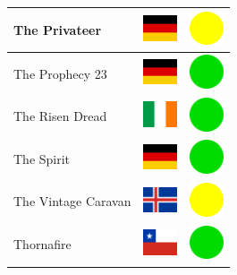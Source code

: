 \documentclass[12pt, a4paper, twoside]{report}
\begin{document}
\begin{center}
\begin{longtable}{|p{5cm}|p{2cm}|p{2cm}|}
The Privateer & \includegraphics[width=1cm]{4x3/de} & \includegraphics[width=1cm]{likes/m} \\ \hline
The Prophecy 23 & \includegraphics[width=1cm]{4x3/de} & \includegraphics[width=1cm]{likes/y} \\ \hline
The Risen Dread & \includegraphics[width=1cm]{4x3/ie} & \includegraphics[width=1cm]{likes/y} \\ \hline
The Spirit & \includegraphics[width=1cm]{4x3/de} & \includegraphics[width=1cm]{likes/y} \\ \hline
The Vintage Caravan & \includegraphics[width=1cm]{4x3/is} & \includegraphics[width=1cm]{likes/m} \\ \hline
Thornafire & \includegraphics[width=1cm]{4x3/cl} & \includegraphics[width=1cm]{likes/y} \\ \hline

\end{longtable}
\end{center}
\end{document}

